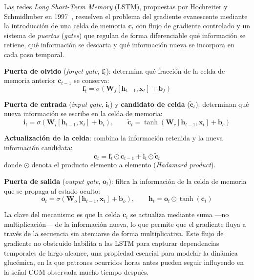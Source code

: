 Las redes \emph{Long Short-Term Memory} (LSTM), propuestas por Hochreiter y Schmidhuber en 1997~\cite{hochreiter1997long}, resuelven el problema del gradiente evanescente mediante la introducción de una celda de memoria $\mathbf{c}_t$ con flujo de gradiente controlado y un sistema de \emph{puertas} (\emph{gates}) que regulan de forma diferenciable qué información se retiene, qué información se descarta y qué información nueva se incorpora en cada paso temporal.

\textbf{Puerta de olvido} (\emph{forget gate}, $\mathbf{f}_t$): determina qué fracción de la celda de memoria anterior $\mathbf{c}_{t-1}$ se conserva:
\begin{equation}
    \mathbf{f}_t = \sigma\!\left(\mathbf{W}_f [\mathbf{h}_{t-1}, \mathbf{x}_t] + \mathbf{b}_f\right)
\end{equation}

\textbf{Puerta de entrada} (\emph{input gate}, $\mathbf{i}_t$) y \textbf{candidato de celda} ($\tilde{\mathbf{c}}_t$): determinan qué nueva información se escribe en la celda de memoria:
\begin{equation}
    \mathbf{i}_t = \sigma\!\left(\mathbf{W}_i [\mathbf{h}_{t-1}, \mathbf{x}_t] + \mathbf{b}_i\right), \qquad
    \tilde{\mathbf{c}}_t = \tanh\!\left(\mathbf{W}_c [\mathbf{h}_{t-1}, \mathbf{x}_t] + \mathbf{b}_c\right)
\end{equation}

\textbf{Actualización de la celda}: combina la información retenida y la nueva información candidata:
\begin{equation}
    \mathbf{c}_t = \mathbf{f}_t \odot \mathbf{c}_{t-1} + \mathbf{i}_t \odot \tilde{\mathbf{c}}_t
\end{equation}
donde $\odot$ denota el producto elemento a elemento (\emph{Hadamard product}).

\textbf{Puerta de salida} (\emph{output gate}, $\mathbf{o}_t$): filtra la información de la celda de memoria que se propaga al estado oculto:
\begin{equation}
    \mathbf{o}_t = \sigma\!\left(\mathbf{W}_o [\mathbf{h}_{t-1}, \mathbf{x}_t] + \mathbf{b}_o\right), \qquad
    \mathbf{h}_t = \mathbf{o}_t \odot \tanh(\mathbf{c}_t)
\end{equation}

La clave del mecanismo es que la celda $\mathbf{c}_t$ se actualiza mediante suma —no multiplicación— de la información nueva, lo que permite que el gradiente fluya a través de la secuencia sin atenuarse de forma multiplicativa. Este flujo de gradiente no obstruido habilita a las LSTM para capturar dependencias temporales de largo alcance, una propiedad esencial para modelar la dinámica glucémica, en la que patrones ocurridos horas antes pueden seguir influyendo en la señal CGM observada mucho tiempo después.

